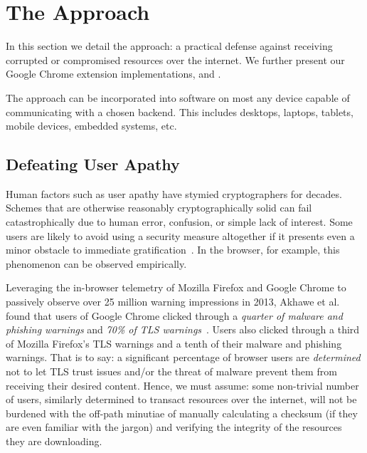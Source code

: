 \section{The \SYSTEM{} Approach} \label{sec:approach}

In this section we detail the \SYSTEM{} approach: a practical defense against
receiving corrupted or compromised resources over the internet. We further
present our Google Chrome extension implementations, \DNSSYS{} and \DHTSYS{}.

The \SYSTEM{} approach can be incorporated into software on most any device
capable of communicating with a chosen backend. This includes desktops, laptops,
tablets, mobile devices, embedded systems, etc.

\subsection{Defeating User Apathy}

Human factors such as user apathy have stymied cryptographers for decades.
Schemes that are otherwise reasonably cryptographically solid can fail
catastrophically due to human error, confusion, or simple lack of interest. Some
users are likely to avoid using a security measure altogether if it presents
even a minor obstacle to immediate gratification~\cite{Clickthrough, PGPBad}. In
the browser, for example, this phenomenon can be observed empirically.


Leveraging the in-browser telemetry of Mozilla Firefox and Google Chrome to
passively observe over 25 million warning impressions in 2013, Akhawe et al.
found that users of Google Chrome clicked through a \emph{quarter of malware and
phishing warnings} and \emph{70\% of TLS warnings}~\cite{Clickthrough}. Users
also clicked through a third of Mozilla Firefox's TLS warnings and a tenth of
their malware and phishing warnings. That is to say: a significant percentage of
browser users are \emph{determined} not to let TLS trust issues and/or the
threat of malware prevent them from receiving their desired content. Hence, we
must assume: some non-trivial number of users, similarly determined to transact
resources over the internet, will not be burdened with the off-path minutiae of
manually calculating a checksum (if they are even familiar with the jargon) and
verifying the integrity of the resources they are downloading.

